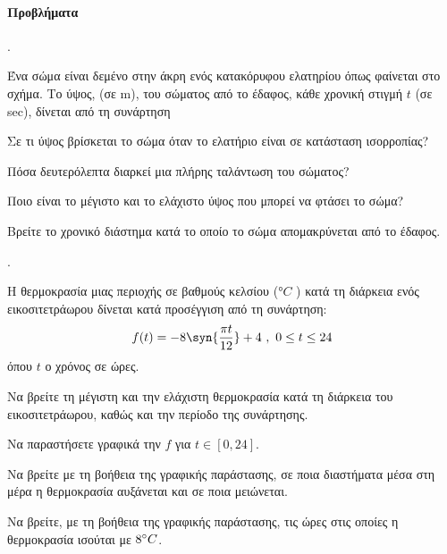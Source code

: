 \documentclass[11pt,a4paper,twocolumn]{article}
\newcounter{askhsh}
\newcommand{\askhsh}{{\large\theaskhsh.}\ \addtocounter{askhsh}{1}}
\newcommand{\eng}[1]{\selectlanguage{english}#1\selectlanguage{greek}}
\begin{document}
\paragraph{Προβλήματα}
\askhsh Ένα σώμα είναι δεμένο στην άκρη ενός κατακόρυφου ελατηρίου όπως φαίνεται στο σχήμα. Το ύψος, (σε \eng{m}), του σώματος από το έδαφος, κάθε χρονική στιγμή $t$ (σε \eng{sec}), δίνεται από τη συνάρτηση
\begin{center}
\end{center}
\begin{alist}
\item Σε τι ύψος βρίσκεται το σώμα όταν το ελατήριο είναι σε κατάσταση ισορροπίας?
\item Πόσα δευτερόλεπτα διαρκεί μια πλήρης ταλάντωση του σώματος?
\item Ποιο είναι το μέγιστο και το ελάχιστο ύψος που μπορεί να φτάσει το σώμα?
\item Βρείτε το χρονικό διάστημα κατά το οποίο το σώμα απομακρύνεται από το έδαφος.
\end{alist}
\askhsh Η θερμοκρασία μιας περιοχής σε βαθμούς κελσίου (°$C$ ) κατά τη διάρκεια ενός εικοσιτετράωρου δίνεται κατά προσέγγιση από τη συνάρτηση:
\[ f(t)=-8\syn{\frac{\pi t}{12}}+4\ ,\ 0\leq t\leq 24 \]
όπου $t$ ο χρόνος σε ώρες.
\begin{alist}
\item Να βρείτε τη μέγιστη και την ελάχιστη θερμοκρασία κατά τη διάρκεια του εικοσιτετράωρου, καθώς και την περίοδο της συνάρτησης.
\item Να παραστήσετε γραφικά την $f$ για $t\in[0,24]$.
\item Να βρείτε με τη βοήθεια της γραφικής παράστασης, σε ποια διαστήματα μέσα στη μέρα η θερμοκρασία αυξάνεται και σε ποια μειώνεται.
\item Να βρείτε, με τη βοήθεια της γραφικής παράστασης, τις ώρες στις οποίες η θερμοκρασία ισούται με $ 8\degree C $.
\end{alist}
\end{document}
